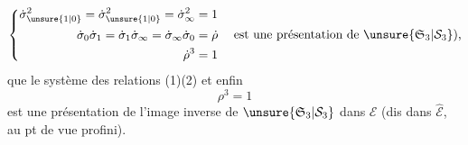 \[
\left\{\begin{aligned}
\dot\sigma_{\unsure{1|0}}^2=\dot\sigma_{\unsure{1|0}}^2=\dot\sigma_\infty^2&=1\\
\dot\sigma_0\dot\sigma_1=\dot\sigma_1\dot\sigma_\infty=\dot\sigma_\infty\dot\sigma_0&=\dot\rho\\
\dot\rho^3&=1
\end{aligned}\right.
\quad\text{est une présentation de }\unsure{\mathfrak S_3|\mathcal S_3}\text{),}
\]
que le système des relations (1)(2) et enfin
\[
\rho^3=1
\]
est une présentation de l'image inverse de $\unsure{\mathfrak S_3|\mathcal S_3}$ dans $\mathcal E$ (dis dans $\widehat{\mathcal E}$, au pt de vue profini).
